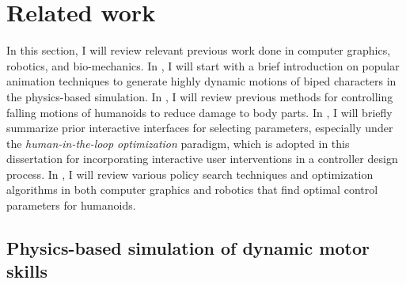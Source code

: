 \chapter{Related work}

In this section, I will review relevant previous work done in 
computer graphics, robotics, and bio-mechanics.
In , I will start with a brief introduction on
popular animation techniques to generate highly dynamic motions
of biped characters in the physics-based simulation.
In , I will review previous methods for controlling
falling motions of humanoids to reduce damage to body parts.
In , I will briefly summarize prior interactive
interfaces for selecting parameters, especially under the 
\emph{human-in-the-loop optimization} paradigm, which is
adopted in this dissertation for incorporating interactive user interventions
in a controller design process.
In , I will review various policy search techniques and
optimization algorithms in both computer graphics and robotics that find
optimal control parameters for humanoids.

\section{Physics-based simulation of dynamic motor skills}
\label{sec:related_dynamic}

